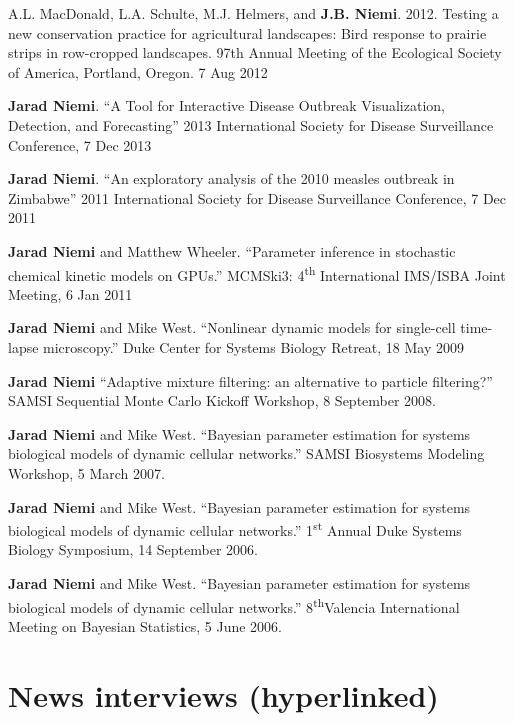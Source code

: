 \documentclass[overlapped,line]{res}
\begin{document}
\begin{resume}
{A.L. MacDonald, L.A. Schulte, M.J. Helmers, and {\bf J.B. Niemi}.  2012.  Testing a new conservation practice for agricultural landscapes: Bird response to prairie strips in row-cropped landscapes.  97th Annual Meeting of the Ecological Society of America, Portland, Oregon. 7 Aug 2012 

{\bf Jarad Niemi}. ``A Tool for Interactive Disease Outbreak Visualization, Detection, and Forecasting'' 2013 International Society for Disease Surveillance Conference, 7 Dec 2013

{\bf Jarad Niemi}. ``An exploratory analysis of the 2010 measles outbreak in Zimbabwe'' 2011 International Society for Disease Surveillance Conference, 7 Dec 2011 

{\bf Jarad Niemi} and Matthew Wheeler. ``Parameter inference in stochastic chemical kinetic models on GPUs.'' MCMSki3: 4\textsuperscript{th} International IMS/ISBA Joint Meeting, 6 Jan 2011

{\bf Jarad Niemi} and Mike West. ``Nonlinear dynamic models for single-cell time-lapse microscopy.'' Duke Center for Systems Biology Retreat, 18 May 2009

{\bf Jarad Niemi} ``Adaptive mixture filtering: an alternative to particle filtering?'' SAMSI Sequential Monte Carlo Kickoff Workshop, 8 September 2008.

{\bf Jarad Niemi} and Mike West. ``Bayesian parameter estimation for systems biological models of dynamic cellular networks.'' SAMSI Biosystems Modeling Workshop, 5 March 2007.

{\bf Jarad Niemi} and Mike West. ``Bayesian parameter estimation for systems biological models of dynamic cellular networks.'' 1\textsuperscript{st} Annual Duke Systems Biology Symposium, 14 September 2006.

{\bf Jarad Niemi} and Mike West. ``Bayesian parameter estimation for systems biological models of dynamic cellular networks.'' 8\textsuperscript{th}Valencia International Meeting on Bayesian Statistics, 5 June 2006.

}



\section{\bf News interviews (hyperlinked)}


\end{resume}
\end{document}
